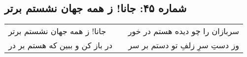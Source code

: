 \begin{center}
\section*{شماره ۴۵: جانا! ز همه جهان نشستم برتر}
\label{sec:045}
\begin{longtable}{l p{0.5cm} r}
جانا! ز همه جهان نشستم برتر
&&
سربازان را چو دیده هستم در خور
\\
در باز کن و ببین که هستم بر در
&&
وز دستِ سرِ زلفِ تو دستم بر سر
\\
\end{longtable}
\end{center}
